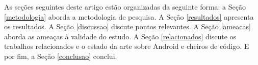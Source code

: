 As seções seguintes deste artigo estão organizadas da seguinte forma: a Seção \ref{metodologia} aborda a metodologia de pesquisa. A Seção \ref{resultados} apresenta os resultados. A Seção \ref{discussao} discute pontos relevantes. A Seção \ref{ameacas} aborda as ameaças à validade do estudo. A Seção \ref{relacionados} discute os trabalhos relacionados e o estado da arte sobre Android e cheiros de código. E por fim, a Seção \ref{conclusao} conclui.
